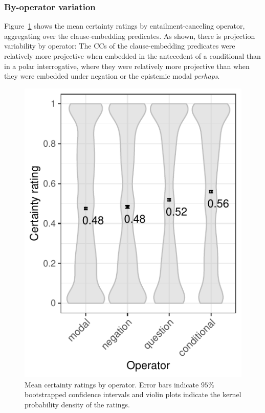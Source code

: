 \documentclass[a4paper,12pt,twoside]{article}
\newcommand{\posscite}[1]{\citeauthor{#1}'s (\citeyear{#1})}
\begin{document}
		
	\subsubsection{By-operator variation}\label{s:by-op}

        Figure~\ref{fig:op-ratings} shows the mean certainty ratings by entailment-canceling operator, aggregating over the clause-embedding predicates. As shown, there is projection variability by operator: The CCs of the clause-embedding predicates were relatively more projective when embedded in the antecedent of a conditional than in a polar interrogative, where they were relatively more projective than when they were embedded under negation or the epistemic modal {\em perhaps}.
        
            \begin{figure}[ht]
				\centering
				\includegraphics[scale = .8]{certainty-operator.pdf}
				\caption{Mean certainty ratings by operator. Error bars indicate $95\%$ bootstrapped confidence intervals and violin plots indicate the kernel probability density of the ratings.
                }
				\label{fig:op-ratings}
			\end{figure}
\end{document}
